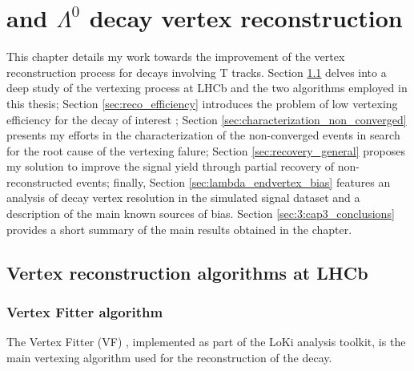 \chapter{\texorpdfstring{\lbz}{Lambdab} and \texorpdfstring{$\Lambda^0$}{Lambda} decay vertex reconstruction}
\label{cap:vertex_reconstruction}
This chapter details my work towards the improvement of the vertex reconstruction process for decays involving T tracks.
Section \ref{sec:reco_algorithms} delves into a deep study of the vertexing process at LHCb and the two algorithms employed in this thesis;
Section \ref{sec:reco_efficiency} introduces the problem of low vertexing efficiency for the decay of interest \demonstratorshort;
Section \ref{sec:characterization_non_converged} presents my efforts in the characterization of the non-converged events in search for the root cause of the vertexing falure;
Section \ref{sec:recovery_general} proposes my solution to improve the signal yield through partial recovery of non-reconstructed events;
finally, Section \ref{sec:lambda_endvertex_bias} features an analysis of \lambdadecay decay vertex resolution in the simulated signal dataset and a description of the main known sources of bias.
Section \ref{sec:3:cap3_conclusions} provides a short summary of the main results obtained in the chapter.

\section{Vertex reconstruction algorithms at LHCb}
\label{sec:reco_algorithms}

\subsection{Vertex Fitter algorithm}
The Vertex Fitter (VF) \cite{twiki_vf}, implemented as part of the LoKi analysis toolkit, is the main vertexing algorithm used for the reconstruction of the \lbz decay.

